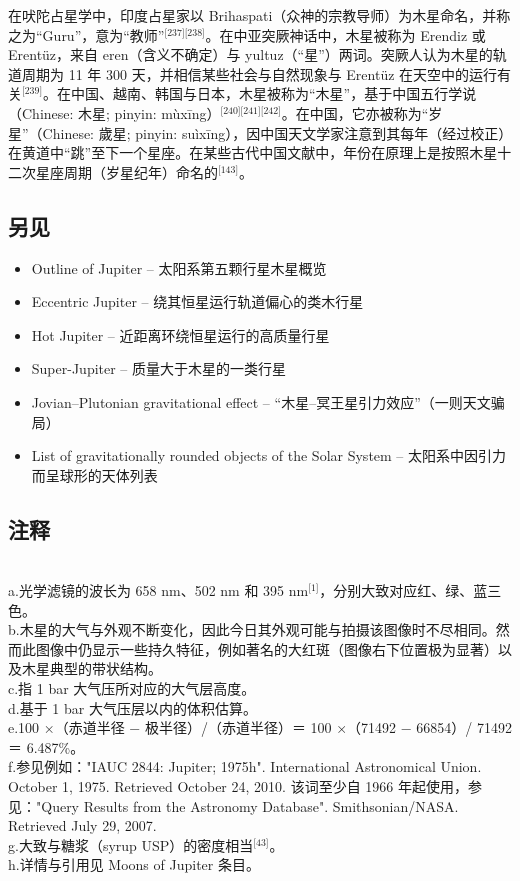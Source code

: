 在吠陀占星学中，印度占星家以 Brihaspati（众神的宗教导师）为木星命名，并称之为“Guru”，意为“教师”\(^\text{[237][238]}\)。在中亚突厥神话中，木星被称为 Erendiz 或 Erentüz，来自 eren（含义不确定）与 yultuz（“星”）两词。突厥人认为木星的轨道周期为 11 年 300 天，并相信某些社会与自然现象与 Erentüz 在天空中的运行有关\(^\text{[239]}\)。在中国、越南、韩国与日本，木星被称为“木星”，基于中国五行学说（Chinese: 木星; pinyin: mùxīng）\(^\text{[240][241][242]}\)。在中国，它亦被称为“岁星”（Chinese: 歲星; pinyin: suìxīng），因中国天文学家注意到其每年（经过校正）在黄道中“跳”至下一个星座。在某些古代中国文献中，年份在原理上是按照木星十二次星座周期（岁星纪年）命名的\(^\text{[143]}\)。
\subsection{另见}
\begin{itemize}
\item Outline of Jupiter – 太阳系第五颗行星木星概览  
\item Eccentric Jupiter – 绕其恒星运行轨道偏心的类木行星  
\item Hot Jupiter – 近距离环绕恒星运行的高质量行星  
\item Super-Jupiter – 质量大于木星的一类行星  
\item Jovian–Plutonian gravitational effect – “木星–冥王星引力效应”（一则天文骗局）  
\item List of gravitationally rounded objects of the Solar System – 太阳系中因引力而呈球形的天体列表  
\end{itemize}
\subsection{注释}\\
a.光学滤镜的波长为 658 nm、502 nm 和 395 nm\(^\text{[1]}\)，分别大致对应红、绿、蓝三色。\\  
b.木星的大气与外观不断变化，因此今日其外观可能与拍摄该图像时不尽相同。然而此图像中仍显示一些持久特征，例如著名的大红斑（图像右下位置极为显著）以及木星典型的带状结构。\\  
c.指 1 bar 大气压所对应的大气层高度。\\  
d.基于 1 bar 大气压层以内的体积估算。\\  
e.100 ×（赤道半径 − 极半径）/（赤道半径）＝ 100 ×（71492 − 66854）/ 71492 ＝ 6.487\%。\\  
f.参见例如："IAUC 2844: Jupiter; 1975h". International Astronomical Union. October 1, 1975. Retrieved October 24, 2010. 该词至少自 1966 年起使用，参见："Query Results from the Astronomy Database". Smithsonian/NASA. Retrieved July 29, 2007. \\
g.大致与糖浆（syrup USP）的密度相当\(^\text{[43]}\)。 \\ 
h.详情与引用见 Moons of Jupiter 条目。
